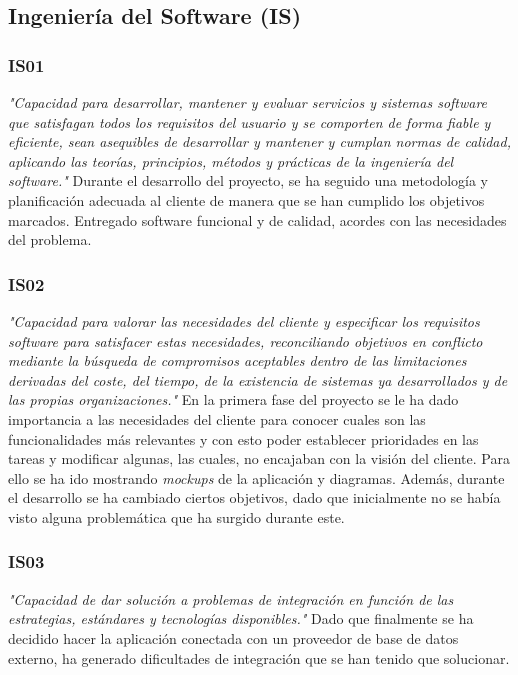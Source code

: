     \subsection{Ingeniería del Software (IS)}

    \subsubsection{IS01}
    \textit{"Capacidad para desarrollar, mantener y evaluar servicios y sistemas software que
    satisfagan todos los requisitos del usuario y se comporten de forma fiable y
    eficiente, sean asequibles de desarrollar y mantener y cumplan normas de
    calidad, aplicando las teorías, principios, métodos y prácticas de la ingeniería del
    software."}
    \medskip
    Durante el desarrollo del proyecto, se ha seguido una metodología y planificación adecuada
    al cliente de manera que se han cumplido los objetivos marcados. Entregado software
    funcional y de calidad, acordes con las necesidades del problema.

    \subsubsection{IS02}
    \textit{"Capacidad para valorar las necesidades del cliente y especificar los requisitos
    software para satisfacer estas necesidades, reconciliando objetivos en
    conflicto mediante la búsqueda de compromisos aceptables dentro de
    las limitaciones derivadas del coste, del tiempo, de la existencia de sistemas ya
    desarrollados y de las propias organizaciones."}
    \medskip
    En la primera fase del proyecto se le ha dado importancia a las necesidades del cliente
    para conocer cuales son las funcionalidades más relevantes y con esto poder establecer
    prioridades en las tareas y modificar algunas, las cuales, no encajaban con la visión
    del cliente.
    \medskip
    Para ello se ha ido mostrando \textit{mockups} de la aplicación y diagramas. Además, durante
    el desarrollo se ha cambiado ciertos objetivos, dado que inicialmente no se había visto
    alguna problemática que ha surgido durante este.

    \subsubsection{IS03}
    \textit{"Capacidad de dar solución a problemas de integración en función de las estrategias,
    estándares y tecnologías disponibles."}
    \medskip
    Dado que finalmente se ha decidido hacer la aplicación conectada con un proveedor de base de
    datos externo, ha generado dificultades de integración que se han tenido que solucionar.

